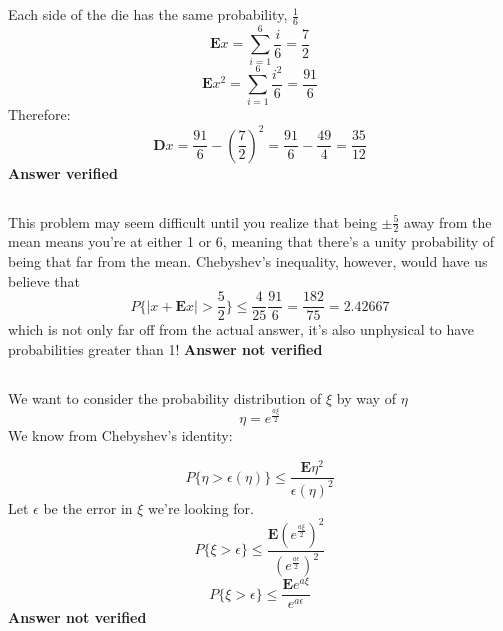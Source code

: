 \subsection{}
Each side of the die has the same probability, $\frac{1}{6}$
\begin{equation}
	\textbf{E}x = \sum_{i=1}^6 \frac{i}{6} = \frac{7}{2}
\end{equation}
\begin{equation}
	\textbf{E}x^2 = \sum_{i=1}^6 \frac{i^2}{6} = \frac{91}{6}
\end{equation}
Therefore:
\begin{equation}
	\textbf{D}x = \frac{91}{6} - \left( \frac{7}{2} \right)^2 = \frac{91}{6} - \frac{49}{4} = \frac{35}{12}
\end{equation}
\textbf{Answer verified}

\subsection{}
This problem may seem difficult until you realize that being $\pm \frac{5}{2}$ away from the mean means you're at either 1 or 6, meaning that there's a unity probability of being that far from the mean.  Chebyshev's inequality, however, would have us believe that 
\begin{equation}
	P \{ |x + \textbf{E}x| > \frac{5}{2}  \} \leq \frac{4}{25} \frac{91}{6} = \frac{182}{75} = 2.42667
\end{equation}
which is not only far off from the actual answer, it's also unphysical to have probabilities greater than 1!
\textbf{Answer not verified}

\subsection{}
We want to consider the probability distribution of $\xi$ by way of $\eta$
\begin{equation}
	\eta = e^{\frac{a\xi}{2}} 
\end{equation}
We know from Chebyshev's identity:

\begin{equation}
	P\{ \eta > \epsilon(\eta) \} \leq \frac{\textbf{E}\eta^2}{\epsilon(\eta)^2} 
\end{equation}
Let $\epsilon$ be the error in $\xi$ we're looking for.
\begin{equation}
	P\{ \xi > \epsilon \} \leq \frac{\textbf{E}(e^{\frac{a\xi}{2}})^2}{(e^{\frac{a\epsilon}{2}})^2} 
\end{equation}
\begin{equation}
	P\{ \xi > \epsilon \} \leq \frac{\textbf{E}e^{a\xi}}{e^{a\epsilon}} 
\end{equation}
\textbf{Answer not verified}


